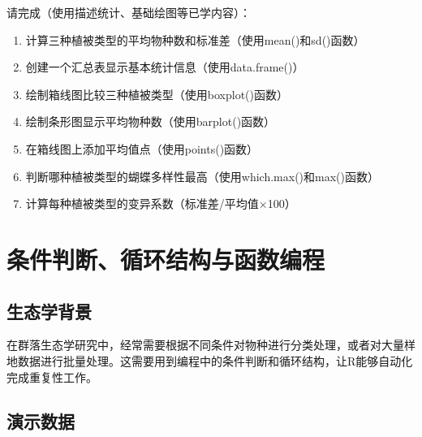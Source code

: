 \documentclass[
]{book}
\begin{document}
请完成（使用描述统计、基础绘图等已学内容）：

\begin{enumerate}
\def\labelenumi{\arabic{enumi}.}
\item
  计算三种植被类型的平均物种数和标准差（使用mean()和sd()函数）
\item
  创建一个汇总表显示基本统计信息（使用data.frame()）
\item
  绘制箱线图比较三种植被类型（使用boxplot()函数）
\item
  绘制条形图显示平均物种数（使用barplot()函数）
\item
  在箱线图上添加平均值点（使用points()函数）
\item
  判断哪种植被类型的蝴蝶多样性最高（使用which.max()和max()函数）
\item
  计算每种植被类型的变异系数（标准差/平均值×100）
\end{enumerate}

\hypertarget{ux6761ux4ef6ux5224ux65adux5faaux73afux7ed3ux6784ux4e0eux51fdux6570ux7f16ux7a0b}{%
\section{条件判断、循环结构与函数编程}\label{ux6761ux4ef6ux5224ux65adux5faaux73afux7ed3ux6784ux4e0eux51fdux6570ux7f16ux7a0b}}

\hypertarget{ux751fux6001ux5b66ux80ccux666f-7}{%
\subsection{生态学背景}\label{ux751fux6001ux5b66ux80ccux666f-7}}

在群落生态学研究中，经常需要根据不同条件对物种进行分类处理，或者对大量样地数据进行批量处理。这需要用到编程中的条件判断和循环结构，让R能够自动化完成重复性工作。

\hypertarget{ux6f14ux793aux6570ux636e-6}{%
\subsection{演示数据}\label{ux6f14ux793aux6570ux636e-6}}
\end{document}

